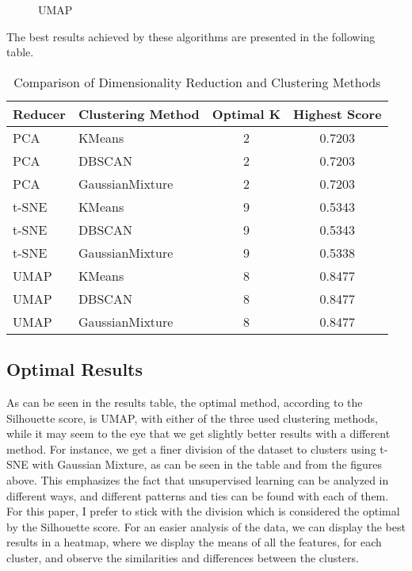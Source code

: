 \documentclass{article}
\begin{document}
\begin{figure}[H]
    \centering
    \caption{UMAP}
\end{figure}
The best results achieved by these algorithms are presented in the following table.

\begin{table}[h]
\centering
\begin{tabular}{|l|l|c|c|}
\hline
\textbf{Reducer} & \textbf{Clustering Method} & \textbf{Optimal K} & \textbf{Highest Score} \\
\hline
PCA & KMeans & 2 & 0.7203 \\
PCA & DBSCAN & 2 & 0.7203 \\
PCA & GaussianMixture & 2 & 0.7203 \\
t-SNE & KMeans & 9 & 0.5343 \\
t-SNE & DBSCAN & 9 & 0.5343 \\
t-SNE & GaussianMixture & 9 & 0.5338 \\
UMAP & KMeans & 8 & 0.8477 \\
UMAP & DBSCAN & 8 & 0.8477 \\
UMAP & GaussianMixture & 8 & 0.8477 \\
\hline
\end{tabular}
\caption{Comparison of Dimensionality Reduction and Clustering Methods}
\label{tab:reduction_clustering_comparison}
\end{table}
\subsection{Optimal Results}
As can be seen in the results table, the optimal method, according to the Silhouette score, is UMAP, with either of the three used clustering methods, while it may seem to the eye that we get slightly better results with a different method. For instance, we get a finer division of the dataset to clusters using t-SNE with Gaussian Mixture, as can be seen in the table and from the figures above. This emphasizes the fact that unsupervised learning can be analyzed in different ways, and different patterns and ties can be found with each of them. For this paper, I prefer to stick with the division which is considered the optimal by the Silhouette score.
For an easier analysis of the data, we can display the best results in a heatmap, where we display the means of all the features, for each cluster, and observe the similarities and differences between the clusters.
\end{document}
